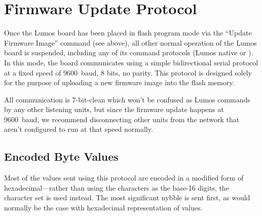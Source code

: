 \documentclass[letterpaper,twoside,onecolumn,openright,final]{memoir}
\begin{document}
%
%

\section{Firmware Update Protocol}
\NotInQS
\label{sec:flashprogproto}
Once the Lumos board has been placed in flash program mode via the 
 ``Update Firmware Image'' command (see above), all other 
normal operation of the Lumos board is suspended, including any of its
command protocols (Lumos native or ).  In this mode, the
board communicates using a simple bidirectional serial protocol at a fixed
speed of 9600~baud, 8 bits, no parity.  This protocol is designed solely
for the purpose of uploading a new firmware image into the flash memory.

All communication is 7-bit-clean  which won't be confused
as Lumos commands by any other listening units, but since the firmware
update happens at 9600~baud, we recommend disconnecting other units from
the network that aren't configured to run at that speed normally.

\subsection{Encoded Byte Values}\label{ss:flashbytes}
Most of the values sent using this protocol are encoded in a modified
form of hexadecimal---rather than using the characters 
as the base-16 digits, the character set  is used instead.
The most significant nybble is sent first, as would normally be the case
with hexadecimal representation of values.
\end{document}
